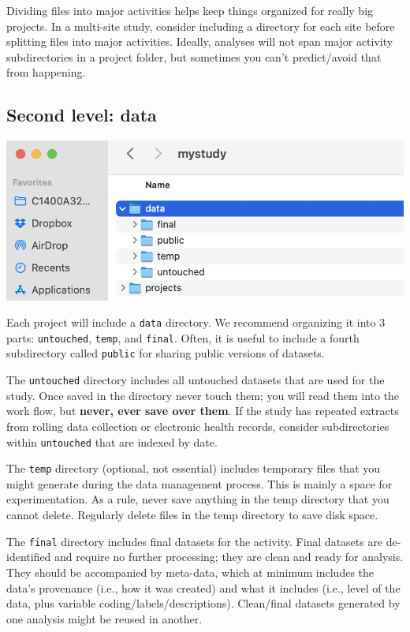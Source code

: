 \documentclass[
]{book}
\begin{document}
Dividing files into major activities helps keep things organized for really big projects. In a multi-site study, consider including a directory for each site before splitting files into major activities. Ideally, analyses will not span major activity subdirectories in a project folder, but sometimes you can't predict/avoid that from happening.

\subsection{Second level: data}\label{second-level-data}

\includegraphics[width=0.75\linewidth]{images/mystudy-dir-fig2}

Each project will include a \texttt{data} directory. We recommend organizing it into 3 parts: \texttt{untouched}, \texttt{temp}, and \texttt{final}. Often, it is useful to include a fourth subdirectory called \texttt{public} for sharing public versions of datasets.

The \texttt{untouched} directory includes all untouched datasets that are used for the study. Once saved in the directory never touch them; you will read them into the work flow, but \textbf{never, ever save over them}. If the study has repeated extracts from rolling data collection or electronic health records, consider subdirectories within \texttt{untouched} that are indexed by date.

The \texttt{temp} directory (optional, not essential) includes temporary files that you might generate during the data management process. This is mainly a space for experimentation. As a rule, never save anything in the temp directory that you cannot delete. Regularly delete files in the temp directory to save disk space.

The \texttt{final} directory includes final datasets for the activity. Final datasets are de-identified and require no further processing; they are clean and ready for analysis. They should be accompanied by meta-data, which at minimum includes the data's provenance (i.e., how it was created) and what it includes (i.e., level of the data, plus variable coding/labels/descriptions). Clean/final datasets generated by one analysis might be reused in another.
\end{document}
